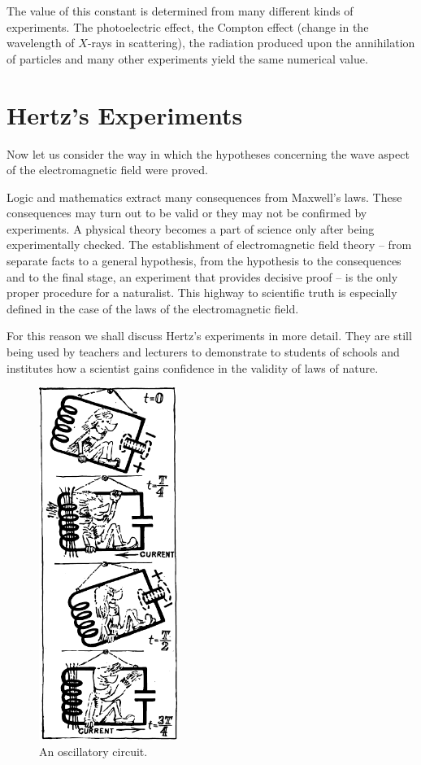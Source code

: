 The value of this constant is determined from many different kinds of experiments. The photoelectric effect, the Compton effect (change in the wavelength of $X$-rays in scattering), the radiation produced upon the annihilation of particles and many other experiments yield the same numerical value.


\section{Hertz's Experiments}

Now let us consider the way in which the hypotheses concerning the wave aspect of the electromagnetic field were proved.

Logic and mathematics extract many consequences from Maxwell's laws. These consequences may turn out to be valid or they may not be confirmed by experiments. A physical theory becomes a part of science only after being experimentally checked. The establishment of electromagnetic field theory -- from separate facts to a general hypothesis, from the hypothesis to the consequences and to the final stage, an experiment that provides decisive proof -- is the only proper procedure for a naturalist. This highway to scientific truth is especially defined in the case of the laws of the electromagnetic field.

For this reason we shall discuss Hertz's experiments in more detail. They are still being used by teachers and lecturers to demonstrate to students of schools and institutes how a scientist gains confidence in the validity of laws of nature.
\begin{figure}[!ht]
\centering
\includegraphics[width=0.4\textwidth]{figures/fig-05-05.pdf}
\caption{An oscillatory circuit.}
\label{fig-5.5}
\end{figure}

